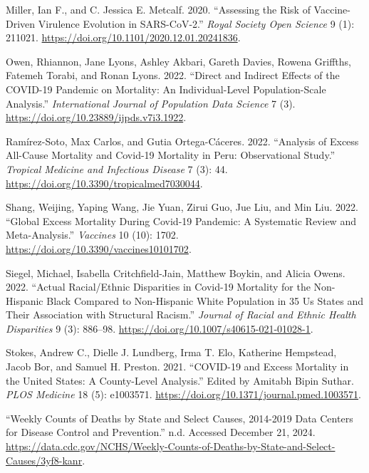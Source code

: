 \documentclass[
  letterpaper,
  DIV=11,
  numbers=noendperiod]{scrartcl}
\newlength{\cslhangindent}
\newenvironment{CSLReferences}[2] %
 {\begin{list}{}{%
  \setlength{\itemindent}{0pt}
  \setlength{\leftmargin}{0pt}
  \setlength{\parsep}{0pt}
  \ifodd #1
   \setlength{\leftmargin}{\cslhangindent}
   \setlength{\itemindent}{-1\cslhangindent}
  \fi
  \setlength{\itemsep}{#2\baselineskip}}}
 {\end{list}}
\begin{document}
\begin{CSLReferences}{1}{0}
Miller, Ian F., and C. Jessica E. Metcalf. 2020. {``Assessing the Risk
of Vaccine-Driven Virulence Evolution in {SARS}-{CoV}-2.''} \emph{Royal
Society Open Science} 9 (1): 211021.
\url{https://doi.org/10.1101/2020.12.01.20241836}.

Owen, Rhiannon, Jane Lyons, Ashley Akbari, Gareth Davies, Rowena
Griffths, Fatemeh Torabi, and Ronan Lyons. 2022. {``Direct and Indirect
Effects of the {COVID}-19 Pandemic on Mortality: An Individual-Level
Population-Scale Analysis.''} \emph{International Journal of Population
Data Science} 7 (3). \url{https://doi.org/10.23889/ijpds.v7i3.1922}.

Ramírez-Soto, Max Carlos, and Gutia Ortega-Cáceres. 2022. {``Analysis of
Excess All-Cause Mortality and Covid-19 Mortality in Peru: Observational
Study.''} \emph{Tropical Medicine and Infectious Disease} 7 (3): 44.
\url{https://doi.org/10.3390/tropicalmed7030044}.

Shang, Weijing, Yaping Wang, Jie Yuan, Zirui Guo, Jue Liu, and Min Liu.
2022. {``Global Excess Mortality During Covid-19 Pandemic: A Systematic
Review and Meta-Analysis.''} \emph{Vaccines} 10 (10): 1702.
\url{https://doi.org/10.3390/vaccines10101702}.

Siegel, Michael, Isabella Critchfield-Jain, Matthew Boykin, and Alicia
Owens. 2022. {``Actual Racial/Ethnic Disparities in Covid-19 Mortality
for the Non-Hispanic Black Compared to Non-Hispanic White Population in
35 Us States and Their Association with Structural Racism.''}
\emph{Journal of Racial and Ethnic Health Disparities} 9 (3): 886--98.
\url{https://doi.org/10.1007/s40615-021-01028-1}.

Stokes, Andrew C., Dielle J. Lundberg, Irma T. Elo, Katherine Hempstead,
Jacob Bor, and Samuel H. Preston. 2021. {``{COVID}-19 and Excess
Mortality in the {United} {States}: {A} County-Level Analysis.''} Edited
by Amitabh Bipin Suthar. \emph{PLOS Medicine} 18 (5): e1003571.
\url{https://doi.org/10.1371/journal.pmed.1003571}.

{``Weekly Counts of Deaths by State and Select Causes, 2014-2019
{\textbar} Data {\textbar} Centers for Disease Control and
Prevention.''} n.d. Accessed December 21, 2024.
\url{https://data.cdc.gov/NCHS/Weekly-Counts-of-Deaths-by-State-and-Select-Causes/3yf8-kanr}.


\end{CSLReferences}
\end{document}
